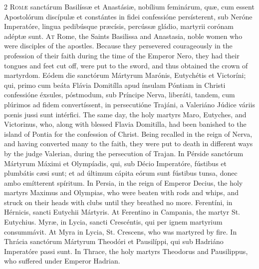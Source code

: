 \begin{paracol}{2}
\lettrine[lines=2]{R}{omæ} sanctárum 
 Basilíssæ et Anastásiæ, nobílium feminárum, quæ, cum essent Apostolórum 
 discípulæ et constántes in fidei confessióne persísterent, sub Neróne 
 Imperatóre, lingua pedibúsque præcísis, percússæ gládio, martyrii corónam 
 adéptæ sunt.
\switchcolumn
{}
\lettrine[lines=2]{A}{t} Rome, the Saints Basilissa and 
 Anastasia, noble women who were disciples of the apostles. Because 
 they persevered courageously in the profession of their faith during 
 the time of the Emperor Nero, they had their tongues and feet cut off, were 
 put to the sword, and thus obtained the crown of martyrdom.
\switchcolumn*
{}
Eódem die sanctórum 
 Mártyrum Marónis, Eutychétis et Victoríni; qui, primo cum beáta Flávia 
 Domitílla apud ínsulam Póntiam in Christi confessióne 
 éxsules, póstmodum, 
 sub Príncipe Nerva, liberáti, tandem, cum plúrimos ad fidem convertíssent, 
 in persecutióne Trajáni, a Valeriáno Júdice váriis pœnis jussi sunt 
 intérfici.
\switchcolumn
{}
The same day, the holy martyrs Maro, 
 Eutyches, and Victorinus, who, along with blessed Flavia Domitilla, had been 
 banished to the island of Pontia for the confession of Christ. Being 
 recalled in the reign of Nerva, and having converted many to the faith, they 
 were put to death in different ways by the judge Valerian, during the 
 persecution of Trajan.
\switchcolumn*
{}
In Pérside sanctórum 
 Mártyrum Máximi et Olympíadis, qui, sub Décio Imperatóre, fústibus et 
 plumbátis cæsi sunt; et ad últimum cápita eórum sunt fústibus tunsa, donec 
 ambo emítterent spíritum.
\switchcolumn
{}
In Persia, in the reign of Emperor 
 Decius, the holy martyrs Maximus and Olympias, who were beaten with rods and 
 whips, and struck on their heads with clubs until they breathed no more.
\switchcolumn*
{}
Ferentíni, in Hérnicis, 
 sancti Eutychii Mártyris.
\switchcolumn
{}
At Ferentino in Campania, the 
 martyr St. Eutychius.
\switchcolumn*
{}
Myræ, in Lycia, sancti 
 Crescéntis, qui per ignem martyrium consummávit.
\switchcolumn
{}
At Myra in Lycia, St. Crescens, who 
 was martyred by fire.
\switchcolumn*
{}
In Thrácia sanctórum 
 Mártyrum Theodóri et Pausilíppi, qui sub Hadriáno Imperatóre passi sunt.
\switchcolumn
{}
In Thrace, the holy martyrs 
 Theodorus and Pausilippus, who suffered under Emperor Hadrian.
\switchcolumn*
{}
\end{paracol}


